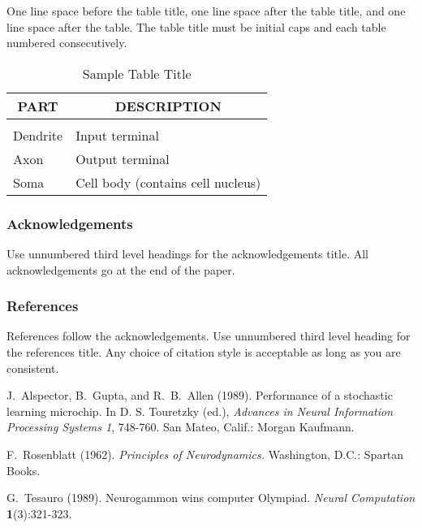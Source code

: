 One line space before the table title, one line space after the table
title, and one line space after the table. The table title must be
initial caps and each table numbered consecutively.

\begin{table}[h]
\caption{Sample Table Title}
\label{sample-table}
\begin{center}
\begin{tabular}{ll}
\multicolumn{1}{c}{\bf PART}  &\multicolumn{1}{c}{\bf DESCRIPTION} \\
\hline \\
Dendrite         &Input terminal \\
Axon             &Output terminal \\
Soma             &Cell body (contains cell nucleus) \\
\end{tabular}
\end{center}
\end{table}

\newpage

\subsubsection*{Acknowledgements}

Use unnumbered third level headings for the acknowledgements title.
All acknowledgements go at the end of the paper.


\subsubsection*{References}

References follow the acknowledgements.  Use unnumbered third level
heading for the references title.  Any choice of citation style is
acceptable as long as you are consistent.


J.~Alspector, B.~Gupta, and R.~B.~Allen  (1989). Performance of a
stochastic learning microchip.  In D. S. Touretzky (ed.), {\it Advances
in Neural Information Processing Systems 1}, 748-760.  San Mateo, Calif.:
Morgan Kaufmann.

F.~Rosenblatt (1962). {\it Principles of Neurodynamics.} Washington,
D.C.: Spartan Books.

G.~Tesauro (1989). Neurogammon wins computer Olympiad.  {\it Neural
Computation} {\bf 1}(3):321-323.


